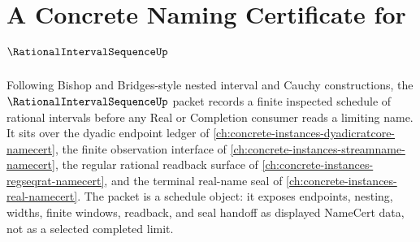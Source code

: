 \chapter{A Concrete Naming Certificate for $\RationalIntervalSequenceUp$}
\label{ch:concrete-instances-rational-interval-sequence-namecert}

Following Bishop and Bridges-style nested interval and Cauchy constructions, the $\RationalIntervalSequenceUp$ packet records a finite inspected schedule of rational intervals before any Real or Completion consumer reads a limiting name. It sits over the dyadic endpoint ledger of \autoref{ch:concrete-instances-dyadicratcore-namecert}, the finite observation interface of \autoref{ch:concrete-instances-streamname-namecert}, the regular rational readback surface of \autoref{ch:concrete-instances-regseqrat-namecert}, and the terminal real-name seal of \autoref{ch:concrete-instances-real-namecert}. The packet is a schedule object: it exposes endpoints, nesting, widths, finite windows, readback, and seal handoff as displayed NameCert data, not as a selected completed limit.

